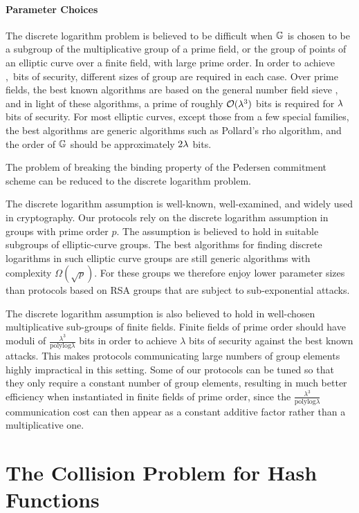 \paragraph{Parameter Choices} The discrete logarithm problem is believed to be difficult when $\mathbb{G}$ is chosen to be a subgroup of the multiplicative group of a prime field, or the group of points of an elliptic curve over a finite field, with large prime order. In order to achieve \sep\ bits of security, different sizes of group are required in each case. Over prime fields, the best known algorithms are based on the general number field sieve \cite{schiro}, and in light of these algorithms, a prime of roughly $\mathcal{O}(\lambda^3)$ bits is required for $\lambda$ bits of security. For most elliptic curves, except those from a few special families, the best algorithms are generic algorithms such as Pollard's rho algorithm, and the order of $\mathbb{G}$ should be approximately $2\lambda$ bits.

The problem of breaking the binding property of the Pedersen commitment scheme can be reduced to the discrete logarithm problem.

The discrete logarithm assumption is well-known, well-examined, and widely used in cryptography. Our protocols rely on the discrete logarithm assumption in groups with prime order $p$. The assumption is believed to hold in suitable subgroups of elliptic-curve groups. The best algorithms for finding discrete logarithms in such elliptic curve groups are still generic algorithms with complexity $\Omega (\sqrt{p})$. For these groups we therefore enjoy lower parameter sizes than protocols based on RSA groups that are subject to sub-exponential attacks.

The discrete logarithm assumption is also believed to hold in well-chosen multiplicative sub-groups of finite fields. Finite fields of prime order should have moduli of $\frac{\lambda^3}{\mathrm{polylog}\lambda}$ bits in order to achieve $\lambda$ bits of security against the best known attacks. This makes protocols communicating large numbers of group elements highly impractical in this setting. Some of our protocols can be tuned so that they only require a constant number of group elements, resulting in much better efficiency when instantiated in finite fields of prime order, since the $\frac{\lambda^3}{\mathrm{polylog}\lambda}$ communication cost can then appear as a constant additive factor rather than a multiplicative one.

\section{The Collision Problem for Hash Functions}

